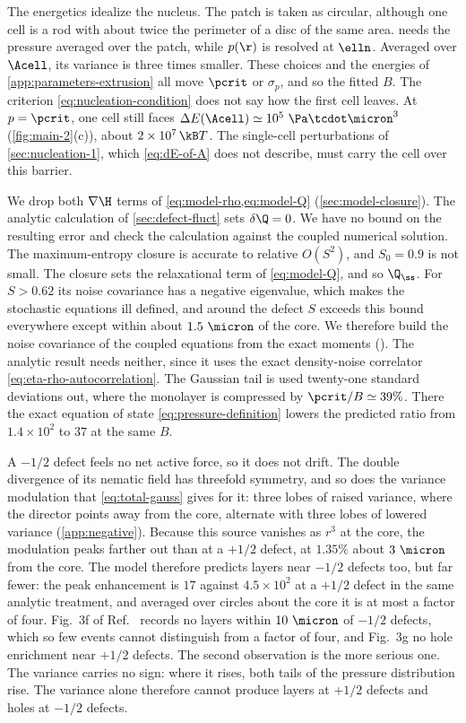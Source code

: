 The energetics idealize the nucleus. The patch is taken as circular, although one cell is
a rod with about twice the perimeter of a disc of the same area.
 needs the pressure averaged over the patch, while $p(\r)$ is
resolved at $\elln$. Averaged over $\Acell$, its variance is three times smaller. These
choices and the energies of \cref{app:parameters-extrusion} all move $\pcrit$ or $\sigma_p$, and so the fitted $B$.
The criterion \cref{eq:nucleation-condition} does not say how the first cell leaves. At
$p=\pcrit$, one cell still faces $\Delta E(\Acell)\simeq10^5~\Pa\tcdot\micron^3$
(\cref{fig:main-2}(c)), about $2\times10^7\,\kB T$. The single-cell perturbations of
\cref{sec:nucleation-1}, which \cref{eq:dE-of-A} does not describe, must carry the
cell over this barrier.

We drop both $\nabla\H$ terms of \cref{eq:model-rho,eq:model-Q} (\cref{sec:model-closure}).
The analytic calculation of \cref{sec:defect-fluct} sets $\delta\Q=0$. We have no bound
on the resulting error and check the calculation against the coupled numerical solution.
The maximum-entropy closure is accurate to relative $O(S^2)$, and $S_0=0.9$ is not small.
The closure sets the relaxational term of \cref{eq:model-Q}, and so $\Q_\ss$. For $S>0.62$ its noise
covariance has a negative eigenvalue, which makes the stochastic equations ill defined,
and around the defect $S$ exceeds this bound everywhere except within about
$1.5~\micron$ of the core. We therefore build the noise covariance of the coupled
equations from the exact moments (). The
analytic result needs neither, since it uses the exact density-noise correlator
\cref{eq:eta-rho-autocorrelation}. The
Gaussian tail is used twenty-one standard deviations out, where the monolayer is
compressed by $\pcrit/B\simeq39\%$. There the exact equation of state
\cref{eq:pressure-definition} lowers the predicted ratio from
$1.4\times10^2$ to $37$ at the same $B$.

A $-1/2$ defect feels no net active force, so it does not drift. The double divergence of
its nematic field has threefold symmetry, and so does the variance modulation that
\cref{eq:total-gauss} gives for it: three lobes of raised variance, where the director
points away from the core, alternate with three lobes of lowered variance
(\cref{app:negative}). Because this source vanishes as $r^3$ at the core, the
modulation peaks farther out than at a $+1/2$ defect, at $1.35\%$ about $3~\micron$ from
the core. The model therefore predicts layers near $-1/2$ defects too, but far fewer:
the peak enhancement is $17$ against $4.5\times10^2$ at a $+1/2$ defect in the same
analytic treatment, and averaged over circles about the core it is at most a factor of
four. Fig.~3f of Ref.~\cite{copenhagen2021} records no layers within $10~\micron$ of
$-1/2$ defects, which so few events cannot distinguish from a factor of four, and
Fig.~3g no hole enrichment near $+1/2$ defects. The second observation is the more
serious one. The variance carries no sign: where it rises, both tails of the pressure
distribution rise. The variance alone therefore cannot produce layers at $+1/2$ defects
and holes at $-1/2$ defects.

